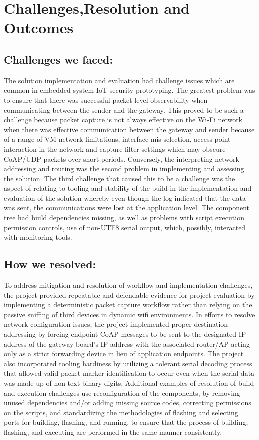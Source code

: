 \documentclass[a4paper]{scrartcl}
\begin{document}
    \section{Challenges,Resolution and Outcomes}
    \subsection{Challenges we faced:}
    The solution implementation and evaluation had challenge issues which are common in embedded system IoT security prototyping. The greatest problem was to ensure that there was successful packet-level observability when communicating between the sender and the gateway. This proved to be such a challenge because packet capture is not always effective on the Wi-Fi network when there was effective communication between the gateway and sender because of a range of VM network limitations, interface mis-selection, access point interaction in the network and capture filter settings which may obscure CoAP/UDP packets over short periods. Conversely, the interpreting network addressing and routing was the second problem in implementing and assessing the solution. The third challenge that caused this to be a challenge was the aspect of relating to tooling and stability of the build in the implementation and evaluation of the solution whereby even though the log indicated that the data was sent, the communications were lost at the application level. The component tree had build dependencies missing, as well as problems with script execution permission controls, use of non-UTF8 serial output, which, possibly, interacted with monitoring tools.

    \subsection{How we resolved:}
    To address mitigation and resolution of workflow and implementation challenges, the project provided repeatable and defendable evidence for project evaluation by implementing a deterministic packet capture workflow rather than relying on the passive sniffing of third devices in dynamic wifi environments. In efforts to resolve network configuration issues, the project implemented proper destination addressing by forcing endpoint CoAP messages to be sent to the designated IP address of the gateway board's IP address with the associated router/AP acting only as a strict forwarding device in lieu of application endpoints. The project also incorporated tooling hardiness by utilizing a tolerant serial decoding process that allowed valid packet marker identification to occur even when the serial data was made up of non-text binary digits. Additional examples of resolution of build and execution challenges use reconfiguration of the components, by removing unused dependencies and/or adding missing source codes, correcting permissions on the scripts, and standardizing the methodologies of flashing and selecting ports for building, flashing, and running, to ensure that the process of building, flashing, and executing are performed in the same manner consistently.
\end{document}
